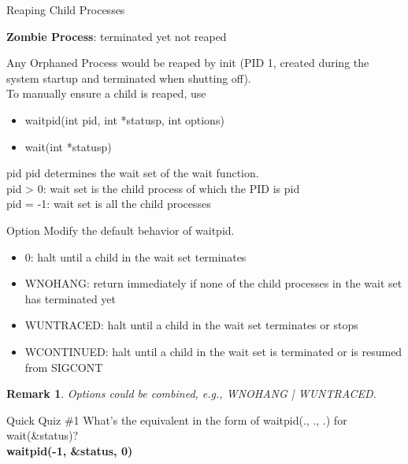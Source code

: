 \documentclass{beamer}
\newtheorem{rmk}{Remark}
\begin{document}
    \begin{frame}{Reaping Child Processes}
        \begin{definition}
            \textbf{Zombie Process}: terminated yet not reaped\\
        \end{definition}
        Any Orphaned Process would be reaped by init (PID 1, created during the system startup and terminated when shutting off).\\
        To manually ensure a child is reaped, use
        \begin{itemize}
            \item waitpid(int pid, int *statusp, int options)
            \item wait(int *statusp)
        \end{itemize}
    \end{frame}
    \begin{frame}{pid}
        pid determines the wait set of the wait function.\\
        pid > 0: wait set is the child process of which the PID is pid\\
        pid = -1: wait set is all the child processes
    \end{frame}
    \begin{frame}{Option}
        Modify the default behavior of waitpid.
        \begin{itemize}
            \item 0: halt until a child in the wait set terminates
            \item WNOHANG: return immediately if none of the child processes in the wait set has terminated yet
            \item WUNTRACED: halt until a child in the wait set terminates or stops
            \item WCONTINUED: halt until a child in the wait set is terminated or is resumed from SIGCONT
        \end{itemize}
        \begin{rmk}
            Options could be combined, e.g., WNOHANG | WUNTRACED.
        \end{rmk}
    \end{frame}
    \begin{frame}{Quick Quiz \#1}
        What's the equivalent in the form of waitpid(., ., .)  for wait(\&status)?\\
        {
            \textbf{waitpid(-1, \&status, 0)}
        }
    \end{frame}
\end{document}
